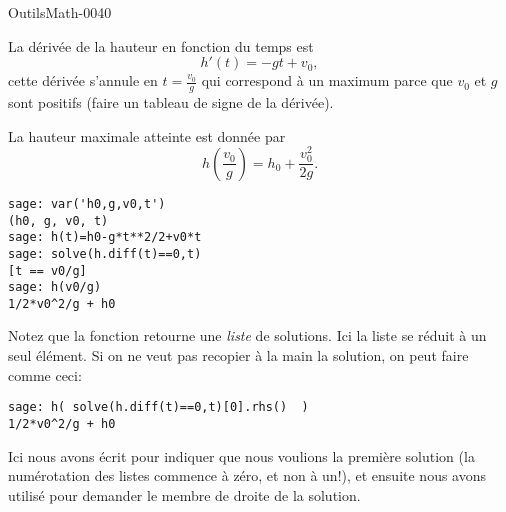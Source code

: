 
\begin{corrige}{OutilsMath-0040}

    La dérivée de la hauteur en fonction du temps est
    \begin{equation}
        h'(t)=-gt+v_0,
    \end{equation}
    cette dérivée s'annule en $t=\frac{ v_0 }{ g }$ qui correspond à un maximum parce que $v_0$ et $g$ sont positifs (faire un tableau de signe de la dérivée).

    La hauteur maximale atteinte est donnée par
    \begin{equation}
        h\left( \frac{ v_0 }{ g } \right)=h_0+\frac{ v_0^2 }{ 2g }.
    \end{equation}

    \begin{verbatim}
sage: var('h0,g,v0,t')
(h0, g, v0, t)
sage: h(t)=h0-g*t**2/2+v0*t 
sage: solve(h.diff(t)==0,t)
[t == v0/g]
sage: h(v0/g)
1/2*v0^2/g + h0
    \end{verbatim}
    Notez que la fonction  retourne une \emph{liste} de solutions. Ici la liste se réduit à un seul élément. Si on ne veut pas recopier à la main la solution, on peut faire comme ceci:
    \begin{verbatim}
sage: h( solve(h.diff(t)==0,t)[0].rhs()  )
1/2*v0^2/g + h0
    \end{verbatim}
    Ici nous avons écrit \info{[0]} pour indiquer que nous voulions la première solution (la numérotation des listes commence à zéro, et non à un!), et ensuite nous avons utilisé  pour demander le membre de droite de la solution.

\end{corrige}
